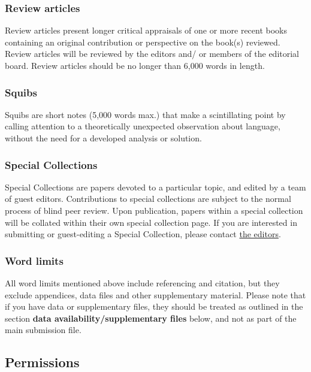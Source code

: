 \documentclass[charis,linguex,biblatex]{glossa}
\begin{document}
\subsubsection{Review articles}

Review articles present longer critical appraisals of one or more recent books containing an original contribution or perspective on the book(s) reviewed. Review articles will be reviewed by the editors and/ or members of the editorial board. Review articles should be no longer than 6,000 words in length.

\subsubsection{Squibs}

Squibs are short notes (5,000 words max.) that make a scintillating point by calling attention to a theoretically unexpected observation about language, without the need for a developed analysis or solution.

\subsubsection{Special Collections}

Special Collections are papers devoted to a particular topic, and edited by a team of guest editors. Contributions to special collections are subject to the normal process of blind peer review. Upon publication, papers within a special collection will be collated within their own special collection page. If you are interested in submitting or guest-editing a Special Collection, please contact \href{https://www.glossa-journal.org/about/editorialteam/}{the editors}.

\subsubsection{Word limits}

All word limits mentioned above include referencing and citation, but they exclude appendices, data files and other supplementary material. Please note that if you have data or supplementary files, they should be treated as outlined in the section \textbf{data availability/supplementary files} below, and not as part of the main submission file.


\subsection{Permissions}
\end{document}
